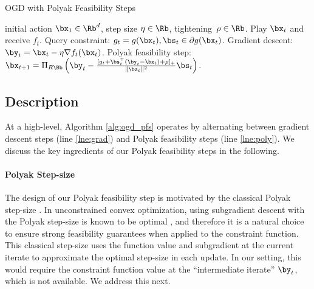 \begin{algorithm}[t]
    \caption{OGD with Polyak Feasibility Steps}
    \label{alg:ogd_pfs}
\begin{algorithmic}[1]
    \INPUT initial action $\bx_1 \in \Rb^d$, step size $\eta \in \Rb$, tightening~$\rho \in \Rb$.
        \STATE Play $\bx_t$ and receive $f_t$.
        \STATE Query constraint: $g_t = g(\bx_t), \bs_t \in \partial g(\bx_t)$.
        \STATE Gradient descent: $\by_{t} = \bx_t - \eta \nabla f_t(\bx_t)$.
        \STATE Polyak feasibility step:\footnotemark\\ $\bx_{t+1} = \Pi_{R \Bb} \left( \by_{t} - \frac{[g_t + \bs_t^\top (\by_{t} - \bx_t) + \rho]_+}{\| \bs_t \|^2} \bs_t \right)$. 
    \ENDFOR
\end{algorithmic}
\end{algorithm}



\subsection{Description}
\label{sec:desc}

At a high-level, Algorithm \ref{alg:ogd_pfs} operates by alternating between gradient descent steps (line \ref{lne:grad}) and Polyak feasibility steps (line \ref{lne:poly}).
We discuss the key ingredients of our Polyak feasibility steps in the following.

\paragraph{Polyak Step-size}

The design of our Polyak feasibility step is motivated by the classical Polyak step-size \cite{polyak1969minimization}.
In unconstrained convex optimization, using subgradient descent with the Polyak step-size is known to be optimal \cite{boyd2003subgradient}, and therefore it is a natural choice to ensure strong feasibility guarantees when applied to the constraint function.
This classical step-size uses the function value and subgradient at the current iterate to approximate the optimal step-size in each update.
In our setting, this would require the constraint function value at the ``intermediate iterate'' $\by_t$, which is not available.
We address this next.


